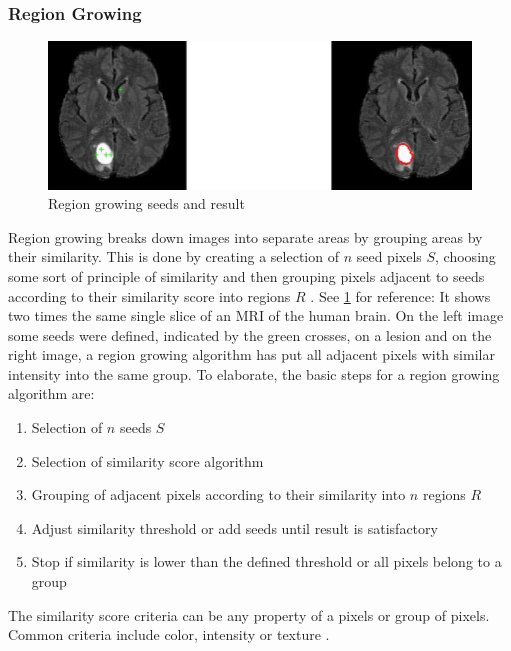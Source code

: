 \subsubsection{Region Growing}
\begin{figure}[h]
	\centerline{\includegraphics[scale=0.5]{images/regionGrowing.png}}
	\caption{Region growing seeds and result \cite{pandyaExploringImageSegmentation2024}}\label{fig:rgSR}
\end{figure}
\noindent
Region growing breaks down images into separate areas by grouping areas by their similarity.
This is done by creating a selection of $n$ seed pixels $S$, choosing some sort of principle of similarity
and then grouping pixels adjacent to seeds according to their similarity score into regions $R$ \cite{jourlinVariousContrastConcepts2016,palReviewImageSegmentation1993}.
See \cref{fig:rgSR} for reference: It shows two times the same single slice of an MRI of the human brain.
On the left image some seeds were defined, indicated by the green crosses, on a lesion
and on the right image, a region growing algorithm has put all adjacent pixels with similar intensity into the same group.
To elaborate, the basic steps for a region growing algorithm are:
\begin{enumerate}
	\item Selection of $n$ seeds $S$
	\item Selection of similarity score algorithm
	\item Grouping of adjacent pixels according to their similarity into $n$ regions $R$
	\item Adjust similarity threshold or add seeds until result is satisfactory
	\item Stop if similarity is lower than the defined threshold or all pixels belong to a group
\end{enumerate}
\noindent
The similarity score criteria can be any property of a pixels or group of pixels.
Common criteria include color, intensity or texture \cite{jourlinVariousContrastConcepts2016,palReviewImageSegmentation1993}.
